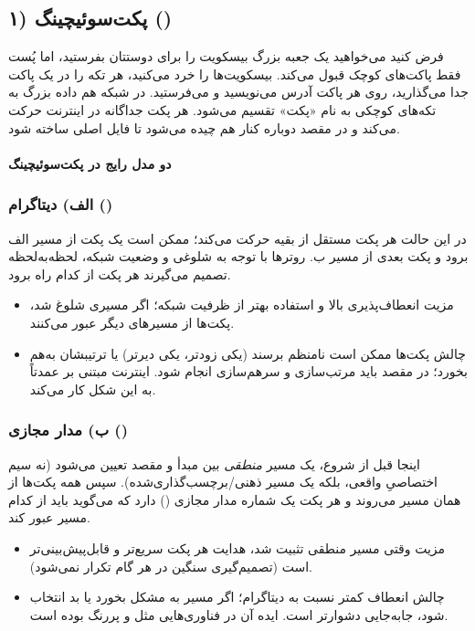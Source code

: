 
\subsection*{۱) پکت‌سوئیچینگ ()}
فرض کنید می‌خواهید یک جعبه بزرگ بیسکویت را برای دوستتان بفرستید، اما پُست فقط پاکت‌های کوچک قبول می‌کند. بیسکویت‌ها را خرد می‌کنید، هر تکه را در یک پاکت جدا می‌گذارید، روی هر پاکت آدرس می‌نویسید و می‌فرستید. در شبکه هم داده بزرگ به تکه‌های کوچکی به نام «پکت» تقسیم می‌شود. هر پکت جداگانه در اینترنت حرکت می‌کند و در مقصد دوباره کنار هم چیده می‌شود تا فایل اصلی ساخته شود.

\paragraph{دو مدل رایج در پکت‌سوئیچینگ}
\subsubsection*{الف) دیتاگرام ()}
در این حالت هر پکت مستقل از بقیه حرکت می‌کند؛ ممکن است یک پکت از مسیر الف برود و پکت بعدی از مسیر ب. روترها با توجه به شلوغی و وضعیت شبکه، لحظه‌به‌لحظه تصمیم می‌گیرند هر پکت از کدام راه برود.
\begin{itemize}
  \item مزیت انعطاف‌پذیری بالا و استفاده بهتر از ظرفیت شبکه؛ اگر مسیری شلوغ شد، پکت‌ها از مسیرهای دیگر عبور می‌کنند.
  \item چالش پکت‌ها ممکن است نامنظم برسند (یکی زودتر، یکی دیرتر) یا ترتیبشان به‌هم بخورد؛ در مقصد باید مرتب‌سازی و سرهم‌سازی انجام شود. اینترنت مبتنی بر  عمدتاً به این شکل کار می‌کند.
\end{itemize}

\subsubsection*{ب) مدار مجازی ()}
اینجا قبل از شروع، یک مسیر \emph{منطقی} بین مبدأ و مقصد تعیین می‌شود (نه سیم اختصاصیِ واقعی، بلکه یک مسیر ذهنی/برچسب‌گذاری‌شده). سپس همه پکت‌ها از همان مسیر می‌روند و هر پکت یک شماره مدار مجازی () دارد که می‌گوید باید از کدام مسیر عبور کند.
\begin{itemize}
  \item مزیت وقتی مسیر منطقی تثبیت شد، هدایت هر پکت سریع‌تر و قابل‌پیش‌بینی‌تر است (تصمیم‌گیری سنگین در هر گام تکرار نمی‌شود).
  \item چالش انعطاف کمتر نسبت به دیتاگرام؛ اگر مسیر به مشکل بخورد یا بد انتخاب شود، جابه‌جایی دشوارتر است. ایده آن در فناوری‌هایی مثل  و  پررنگ بوده است.
\end{itemize}

